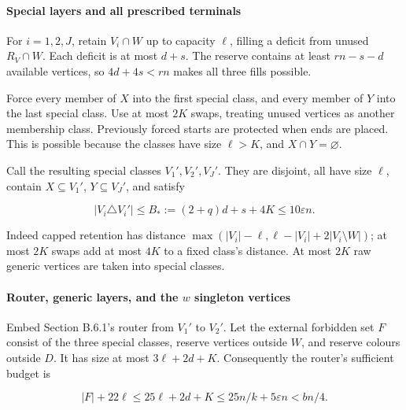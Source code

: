 \documentclass[11pt,a4paper]{article}
\begin{document}
\hypertarget{special-layers-and-all-prescribed-terminals}{%
\paragraph{Special layers and all prescribed terminals}\label{special-layers-and-all-prescribed-terminals}}

For \(i=1,2,J\), retain \(V_i\cap W\) up to capacity \(\ell\), filling a deficit from unused \(R_V\cap W\). Each deficit is at most \(d+s\). The reserve contains at least \(rn-s-d\) available vertices, so \(4d+4s<rn\) makes all three fills possible.

Force every member of \(X\) into the first special class, and every member of \(Y\) into the last special class. Use at most \(2K\) swaps, treating unused vertices as another membership class. Previously forced starts are protected when ends are placed. This is possible because the classes have size \(\ell>K\), and \(X\cap Y=\varnothing\).

Call the resulting special classes \(V_1',V_2',V_J'\). They are disjoint, all have size \(\ell\), contain \(X\subseteq V_1'\), \(Y\subseteq V_J'\), and satisfy

\begin{equation}
|V_i\triangle V_i'|\le B_*:=(2+q)d+s+4K\le10\varepsilon n.
\tag{PF8}\label{eq:PF8}
\end{equation}

Indeed capped retention has distance \(\max(|V_i|-\ell,\ell-|V_i|+2|V_i\setminus W|)\); at most \(2K\) swaps add at most \(4K\) to a fixed class's distance. At most \(2K\) raw generic vertices are taken into special classes.

\hypertarget{router-generic-layers-and-the-w-singleton-vertices}{%
\paragraph{\texorpdfstring{Router, generic layers, and the \(w\) singleton vertices}{Router, generic layers, and the w singleton vertices}}\label{router-generic-layers-and-the-w-singleton-vertices}}

Embed Section B.6.1's router from \(V_1'\) to \(V_2'\). Let the external forbidden set \(F\) consist of the three special classes, reserve vertices outside \(W\), and reserve colours outside \(D\). It has size at most \(3\ell+2d+K\). Consequently the router's sufficient budget is

\begin{equation}
|F|+22\ell\le25\ell+2d+K\le25n/k+5\varepsilon n<bn/4.
\tag{PF9}\label{eq:PF9}
\end{equation}
\end{document}
